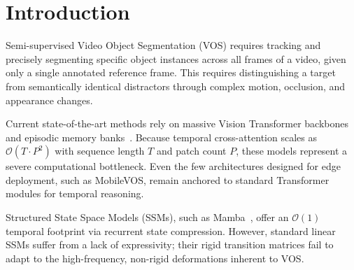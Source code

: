 \documentclass[sigconf]{acmart}
\begin{document}

\maketitle

\section{Introduction}
\label{sec:intro}

Semi-supervised Video Object Segmentation (VOS) requires tracking and precisely segmenting specific object instances across all frames of a video, given only a single annotated reference frame. This requires distinguishing a target from semantically identical distractors through complex motion, occlusion, and appearance changes.

Current state-of-the-art methods rely on massive Vision Transformer backbones and episodic memory banks~\cite{cheng2022xmem, yang2021aot}. Because temporal cross-attention scales as $\mathcal{O}(T \cdot P^2)$ with sequence length $T$ and patch count $P$, these models represent a severe computational bottleneck. Even the few architectures designed for edge deployment, such as MobileVOS, remain anchored to standard Transformer modules for temporal reasoning.

Structured State Space Models (SSMs), such as Mamba~\cite{gu2024mamba}, offer an $\mathcal{O}(1)$ temporal footprint via recurrent state compression. However, standard linear SSMs suffer from a lack of expressivity; their rigid transition matrices fail to adapt to the high-frequency, non-rigid deformations inherent to VOS.
\end{document}
